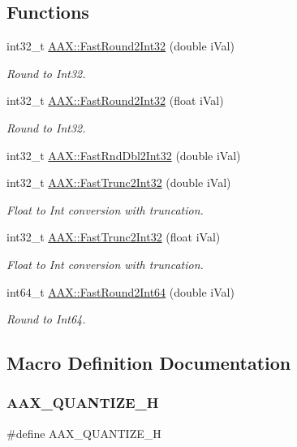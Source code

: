 \subsection*{Functions}
\begin{DoxyCompactItemize}
\item 
int32\+\_\+t \mbox{\hyperlink{a00852_af0bbeabd87aa74be4ecca4f767aedc41}{A\+A\+X\+::\+Fast\+Round2\+Int32}} (double i\+Val)
\begin{DoxyCompactList}\small\item\em Round to Int32. \end{DoxyCompactList}\item 
int32\+\_\+t \mbox{\hyperlink{a00852_a56cd923aeae2bd544f1fb43fff6b0b3d}{A\+A\+X\+::\+Fast\+Round2\+Int32}} (float i\+Val)
\begin{DoxyCompactList}\small\item\em Round to Int32. \end{DoxyCompactList}\item 
int32\+\_\+t \mbox{\hyperlink{a00852_ae690c060a5ff4cb96e77335231a29673}{A\+A\+X\+::\+Fast\+Rnd\+Dbl2\+Int32}} (double i\+Val)
\item 
int32\+\_\+t \mbox{\hyperlink{a00852_ad2b2872b49146cf0859c403fea702a39}{A\+A\+X\+::\+Fast\+Trunc2\+Int32}} (double i\+Val)
\begin{DoxyCompactList}\small\item\em Float to Int conversion with truncation. \end{DoxyCompactList}\item 
int32\+\_\+t \mbox{\hyperlink{a00852_a9a8bc8a47f13b4cb1bb84e45bf43fe82}{A\+A\+X\+::\+Fast\+Trunc2\+Int32}} (float i\+Val)
\begin{DoxyCompactList}\small\item\em Float to Int conversion with truncation. \end{DoxyCompactList}\item 
int64\+\_\+t \mbox{\hyperlink{a00852_a7df6b095ea2469f2adce2a895038212e}{A\+A\+X\+::\+Fast\+Round2\+Int64}} (double i\+Val)
\begin{DoxyCompactList}\small\item\em Round to Int64. \end{DoxyCompactList}\end{DoxyCompactItemize}


\subsection{Macro Definition Documentation}
\mbox{\label{a00776_a8110c1ecf6144fb29de6c94c0572327c}} 
\subsubsection{\texorpdfstring{AAX\_QUANTIZE\_H}{AAX\_QUANTIZE\_H}}
{\footnotesize\ttfamily \#define A\+A\+X\+\_\+\+Q\+U\+A\+N\+T\+I\+Z\+E\+\_\+H}

